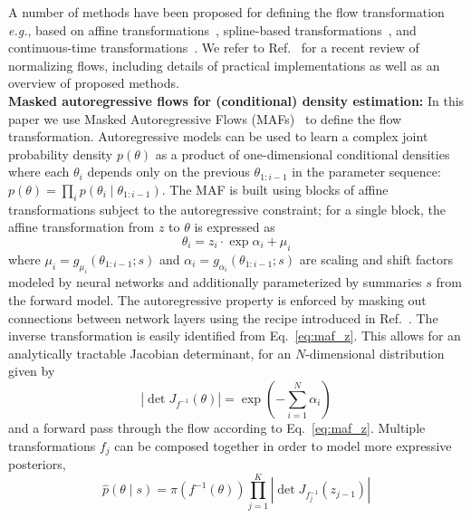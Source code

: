 \documentclass[prd,aps,10pt,nofootinbib,twocolumn,superscriptaddress,preprintnumbers,balancelastpage,longbibliography]{revtex4-1}
\begin{document}
A number of methods have been proposed for defining the flow transformation \emph{e.g.}, based on affine transformations~\cite{10.5555/3294771.3294994,kingma2016improved,dinh2016density,dinh2014nice}, spline-based transformations~\cite{durkan2019neural,durkan2019cubic}, and continuous-time transformations~\cite{grathwohl2018ffjord}. We refer to Ref.~\cite{papamakarios2019normalizing} for a recent review of normalizing flows, including details of practical implementations as well as an overview of proposed methods. \\

\noindent
\textbf{Masked autoregressive flows for (conditional) density estimation:}
In this paper we use Masked Autoregressive Flows (MAFs)~\cite{10.5555/3294771.3294994} to define the flow transformation. Autoregressive models can be used to learn a complex joint probability density $p(\theta)$ as a product of one-dimensional conditional densities where each $\theta_i$ depends only on the previous $\theta_{1:i-1}$ in the parameter sequence: $p(\theta) = \prod_i p(\theta_i\mid \theta_{1:i-1})$. The MAF is built using blocks of affine transformations subject to the autoregressive constraint; for a single block, the affine transformation from $z$ to $\theta$ is expressed as 
\begin{equation}
\label{eq:maf_z}
\theta_{i}=z_{i}\cdot \exp \alpha_{i}+\mu_{i} 
\end{equation}
where $\mu_{i}=g_{\mu_{i}}\left({\theta}_{1: i-1} ; {s}\right)$ and $\alpha_i = g_{\alpha_{i}}\left({\theta}_{1: i-1} ; {s}\right)$ are scaling and shift factors modeled by neural networks and additionally parameterized by summaries $s$ from the forward model. The autoregressive property is enforced by masking out connections between network layers using the recipe introduced in Ref.~\cite{germain2015made}. The inverse transformation is easily identified from Eq.~\eqref{eq:maf_z}. This allows for an analytically tractable Jacobian determinant, for an $N$-dimensional distribution given by
\begin{equation}
\label{eq:det}
\left|\operatorname{det}J_{f^{-1}}(\theta)\right|=\exp \left(-\sum_{i=1}^N \alpha_{i}\right)
\end{equation}
and a forward pass through the flow according to Eq.~\eqref{eq:maf_z}.
Multiple transformations $f_j$ can be composed together in order to model more expressive posteriors,
\begin{equation}
\hat{p}({\theta}\mid s)=\pi\left(f^{-1}({\theta})\right) \prod_{j=1}^{K}\left|\operatorname{det}J_{f^{-1}_j}(z_{j-1})\right|
\end{equation}
\end{document}
